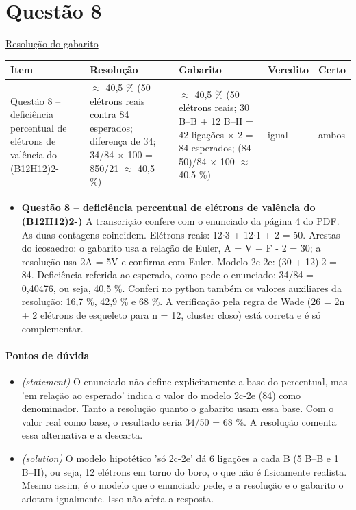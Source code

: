 \documentclass{article}%
\begin{document}
\section*{Questão 8}%
\href{https://poliedroresolve.sistemapoliedro.com.br/vestibulares/ime/2026/ime-2-fase-dia-3-25-10-2025-2-fase-dia-3/dissertativa-8-quimica-2-fase-dia-3-ime-2026}{Resolução do gabarito}\par\smallskip%
\begin{longtable}{@{}p{} p{} p{} p{} p{}@{}}\toprule Item & Resolução & Gabarito & Veredito & Certo \\ \midrule
Questão 8 -- deficiência percentual de elétrons de valência do (B12H12)2- & $\approx$ 40,5 \% (50 elétrons reais contra 84 esperados; diferença de 34; 34/84 $\times$ 100 = 850/21 $\approx$ 40,5 \%) & $\approx$ 40,5 \% (50 elétrons reais; 30 B--B + 12 B--H = 42 ligações $\times$ 2 = 84 esperados; (84 - 50)/84 $\times$ 100 $\approx$ 40,5 \%) & igual & ambos \\
\bottomrule\end{longtable}%
\begin{itemize}%
\item%
\textbf{Questão 8 -- deficiência percentual de elétrons de valência do (B12H12)2-)} A transcrição confere com o enunciado da página 4 do PDF. As duas contagens coincidem. Elétrons reais: 12$\cdot$3 + 12$\cdot$1 + 2 = 50. Arestas do icosaedro: o gabarito usa a relação de Euler, A = V + F - 2 = 30; a resolução usa 2A = 5V e confirma com Euler. Modelo 2c{-}2e: (30 + 12)$\cdot$2 = 84. Deficiência referida ao esperado, como pede o enunciado: 34/84 = 0,40476, ou seja, 40,5 \%. Conferi no python também os valores auxiliares da resolução: 16,7 \%, 42,9 \% e 68 \%. A verificação pela regra de Wade (26 = 2n + 2 elétrons de esqueleto para n = 12, cluster closo) está correta e é só complementar.%
\end{itemize}%
\paragraph{Pontos de dúvida}%
\begin{itemize}%
\item%
\textit{(statement)} O enunciado não define explicitamente a base do percentual, mas 'em relação ao esperado' indica o valor do modelo 2c{-}2e (84) como denominador. Tanto a resolução quanto o gabarito usam essa base. Com o valor real como base, o resultado seria 34/50 = 68 \%. A resolução comenta essa alternativa e a descarta.%
\item%
\textit{(solution)} O modelo hipotético 'só 2c{-}2e' dá 6 ligações a cada B (5 B--B e 1 B--H), ou seja, 12 elétrons em torno do boro, o que não é fisicamente realista. Mesmo assim, é o modelo que o enunciado pede, e a resolução e o gabarito o adotam igualmente. Isso não afeta a resposta.%
\end{itemize}%
\end{document}

